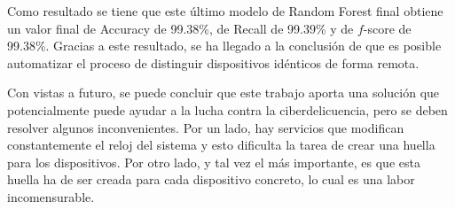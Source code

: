 Como resultado se tiene que este último modelo de Random Forest final obtiene un valor final de Accuracy de 99.38\%, de Recall de 99.39\% y de $f$-score de 99.38\%. Gracias a este resultado, se ha llegado a la conclusión de que es posible automatizar el proceso de distinguir dispositivos idénticos de forma remota.

Con vistas a futuro, se puede concluir que este trabajo aporta una solución que potencialmente puede ayudar a la lucha contra la ciberdelicuencia, pero se deben resolver algunos inconvenientes. Por un lado, hay servicios que modifican constantemente el reloj del sistema y esto dificulta la tarea de crear una huella para los dispositivos. Por otro lado, y tal vez el más importante, es que esta huella ha de ser creada para cada dispositivo concreto, lo cual es una labor incomensurable.


